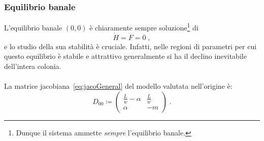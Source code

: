 
\subsubsection{Equilibrio banale}
L'equilibrio banale $(0,0)$ è chiaramente sempre soluzione\footnote{Dunque il sistema ammette
\emph{sempre} l'equilibrio banale.}
di $$\dot{H}=\dot{F}=0 \; ,$$ e lo studio della sua stabilità è cruciale.
Infatti, nelle regioni di parametri per cui questo equilibrio è stabile e attrattivo generalmente si ha il declino
inevitabile dell'intera colonia.

\paragraph{}
La matrice jacobiana~\eqref{eq:jacoGeneral} del modello valutata nell'origine è:
\begin{equation}
    D_{00} \coloneq
    \begin{pmatrix}
        \frac{L}{w} -\alpha &
        \frac{L}{w}
        \\
        \alpha & -m
    \end{pmatrix} \; .
    \label{eq:jacoEquZero}
\end{equation}


